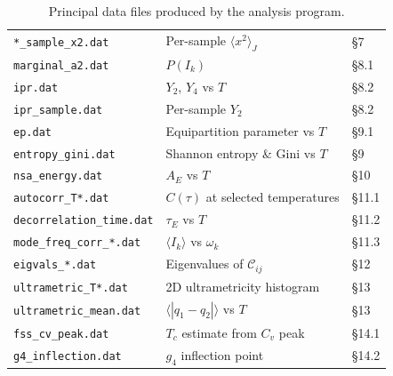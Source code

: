 \documentclass[11pt,a4paper]{article}
\newcommand{\avg}[1]{\langle #1 \rangle}
\begin{document}
\begin{table}[h!]
\begin{tabular}{@{}lll@{}}
\texttt{*\_sample\_x2.dat}            & Per-sample $\avg{x^2}_J$                         & \S7 \\
\texttt{marginal\_a2.dat}              & $P(I_k)$                                        & \S8.1 \\
\texttt{ipr.dat}                        & $Y_2$, $Y_4$ vs $T$                            & \S8.2 \\
\texttt{ipr\_sample.dat}              & Per-sample $Y_2$                                 & \S8.2 \\
\texttt{ep.dat}                         & Equipartition parameter vs $T$                  & \S9.1 \\
\texttt{entropy\_gini.dat}             & Shannon entropy \& Gini vs $T$                  & \S9 \\
\texttt{nsa\_energy.dat}               & $A_E$ vs $T$                                    & \S10 \\
\texttt{autocorr\_T*.dat}              & $C(\tau)$ at selected temperatures               & \S11.1 \\
\texttt{decorrelation\_time.dat}       & $\tau_E$ vs $T$                                  & \S11.2 \\
\texttt{mode\_freq\_corr\_*.dat}       & $\avg{I_k}$ vs $\omega_k$                       & \S11.3 \\
\texttt{eigvals\_*.dat}                & Eigenvalues of $\mathcal{C}_{ij}$                & \S12 \\
\texttt{ultrametric\_T*.dat}           & 2D ultrametricity histogram                      & \S13 \\
\texttt{ultrametric\_mean.dat}         & $\avg{|q_1 - q_2|}$ vs $T$                      & \S13 \\
\texttt{fss\_cv\_peak.dat}             & $T_c$ estimate from $C_v$ peak                  & \S14.1 \\
\texttt{g4\_inflection.dat}            & $g_4$ inflection point                           & \S14.2 \\
\bottomrule
\end{tabular}
\caption{Principal data files produced by the analysis program.}
\end{table}
\end{document}
